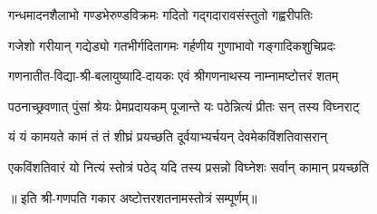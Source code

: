 \twolineshloka
{गन्धमादनशैलाभो गण्डभेरुण्डविक्रमः}%
{गदितो गद्गदारावसंस्तुतो गह्वरीपतिः}%

\twolineshloka
{गजेशो गरीयान् गद्येड्यो गतभीर्गदितागमः}%
{गर्हणीय गुणाभावो गङ्गादिकशुचिप्रदः}%

\twolineshloka
{गणनातीत-विद्या-श्री-बलायुष्यादि-दायकः}%
{एवं श्रीगणनाथस्य नाम्नामष्टोत्तरं शतम्}%

\twolineshloka
{पठनाच्छ्रवणात् पुंसां श्रेयः प्रेमप्रदायकम्}%
{पूजान्ते यः पठेन्नित्यं प्रीतः सन् तस्य विघ्नराट्}%

\twolineshloka
{यं यं कामयते कामं तं तं शीघ्रं प्रयच्छति}%
{दूर्वयाभ्यर्चयन् देवमेकविंशतिवासरान्}%

\twolineshloka
{एकविंशतिवारं यो नित्यं स्तोत्रं पठेद् यदि}%
{तस्य प्रसन्नो विघ्नेशः सर्वान् कामान् प्रयच्छति}%

॥ इति श्री-गणपति गकार अष्टोत्तरशतनामस्तोत्रं सम्पूर्णम्॥
